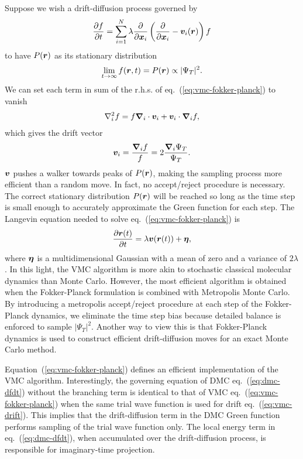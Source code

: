 Suppose we wish a drift-diffusion process governed by
\begin{align} \label{eq:vmc-fokker-planck}
\dfrac{\partial f}{\partial t} = \sum\limits_{i=1}^N \lambda\dfrac{\partial}{\partial\boldsymbol{x}_i}\left(
\dfrac{\partial}{\partial\boldsymbol{x}_i} -\boldsymbol{v}_i(\boldsymbol{r})
\right)f
\end{align}
to have $P(\boldsymbol{r})$ as its stationary distribution
\begin{align}
\lim\limits_{t\rightarrow\infty} f(\boldsymbol{r},t) = P(\boldsymbol{r}) \propto \vert\Psi_T\vert^2.
\end{align}
We can set each term in sum of the r.h.s. of eq.~(\ref{eq:vmc-fokker-planck}) to vanish
\begin{align}
\nabla_i^2 f = f\boldsymbol{\nabla}_i\cdot\boldsymbol{v}_i + \boldsymbol{v}_i\cdot\boldsymbol{\nabla}_if,
\end{align}
which gives the drift vector
\begin{align} \label{eq:vmc-drift}
\boldsymbol{v}_i = \dfrac{\boldsymbol{\nabla}_if}{f} = 2\dfrac{\boldsymbol{\nabla}_i\Psi_T}{\Psi_T}.
\end{align}
$\boldsymbol{v}$ pushes a walker towards peaks of $P(\boldsymbol{r})$, making the sampling process more efficient than a random move.
In fact, no accept/reject procedure is necessary.
The correct stationary distribution $P(\boldsymbol{r})$ will be reached so long as the time step is small enough to accurately approximate the Green function for each step.
The Langevin equation needed to solve eq.~(\ref{eq:vmc-fokker-planck}) is
\begin{align}
\dfrac{\partial\boldsymbol{r}(t)}{\partial t} = \lambda \boldsymbol{v}(\boldsymbol{r}(t)) + \boldsymbol{\eta},
\end{align}
where $\boldsymbol{\eta}$ is a multidimensional Gaussian with a mean of zero and a variance of $2\lambda$. In this light, the VMC algorithm is more akin to stochastic classical molecular dynamics than Monte Carlo. However, the most efficient algorithm is obtained when the Fokker-Planck formulation is combined with Metropolis Monte Carlo. By introducing a metropolis accept/reject procedure at each step of the Fokker-Planck dynamics, we eliminate the time step bias because detailed balance is enforced to sample $\vert\Psi_T\vert^2$. Another way to view this is that Fokker-Planck dynamics is used to construct efficient drift-diffusion moves for an exact Monte Carlo method.

Equation~(\ref{eq:vmc-fokker-planck}) defines an efficient implementation of the VMC algorithm. Interestingly, the governing equation of DMC eq.~(\ref{eq:dmc-dfdt}) without the branching term is identical to that of VMC eq.~(\ref{eq:vmc-fokker-planck}) when the same trial wave function is used for drift eq.~(\ref{eq:vmc-drift}).
This implies that the drift-diffusion term in the DMC Green function performs sampling of the trial wave function only. The local energy term in eq.~(\ref{eq:dmc-dfdt}), when accumulated over the drift-diffusion process, is responsible for imaginary-time projection.

